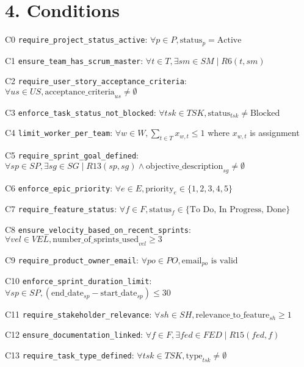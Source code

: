 \documentclass[12pt]{article}
\begin{document}
\section{4. Conditions}
\item[C0] \texttt{require\_project\_status\_active}: $\forall p \in P, \text{status}_p = \text{Active}$
    \item[C1] \texttt{ensure\_team\_has\_scrum\_master}: $\forall t \in T, \exists sm \in SM \mid R6(t, sm)$
    \item[C2] \texttt{require\_user\_story\_acceptance\_criteria}: $\forall us \in US, \text{acceptance\_criteria}_{us} \neq \emptyset$
    \item[C3] \texttt{enforce\_task\_status\_not\_blocked}: $\forall tsk \in TSK, \text{status}_{tsk} \neq \text{Blocked}$
    \item[C4] \texttt{limit\_worker\_per\_team}: $\forall w \in W, \sum_{t \in T} x_{w,t} \leq 1$ where $x_{w,t}$ is assignment
    \item[C5] \texttt{require\_sprint\_goal\_defined}: $\forall sp \in SP, \exists sg \in SG \mid R13(sp, sg) \land \text{objective\_description}_{sg} \neq \emptyset$
    \item[C6] \texttt{enforce\_epic\_priority}: $\forall e \in E, \text{priority}_e \in \{1,2,3,4,5\}$
    \item[C7] \texttt{require\_feature\_status}: $\forall f \in F, \text{status}_f \in \{\text{To Do, In Progress, Done}\}$
    \item[C8] \texttt{ensure\_velocity\_based\_on\_recent\_sprints}: $\forall vel \in VEL, \text{number\_of\_sprints\_used}_{vel} \geq 3$
    \item[C9] \texttt{require\_product\_owner\_email}: $\forall po \in PO, \text{email}_{po} \text{ is valid}$
    \item[C10] \texttt{enforce\_sprint\_duration\_limit}: $\forall sp \in SP, (\text{end\_date}_{sp} - \text{start\_date}_{sp}) \leq 30$
    \item[C11] \texttt{require\_stakeholder\_relevance}: $\forall sh \in SH, \text{relevance\_to\_feature}_{sh} \geq 1$
    \item[C12] \texttt{ensure\_documentation\_linked}: $\forall f \in F, \exists fed \in FED \mid R15(fed, f)$
    \item[C13] \texttt{require\_task\_type\_defined}: $\forall tsk \in TSK, \text{type}_{tsk} \neq \emptyset$
\end{document}
